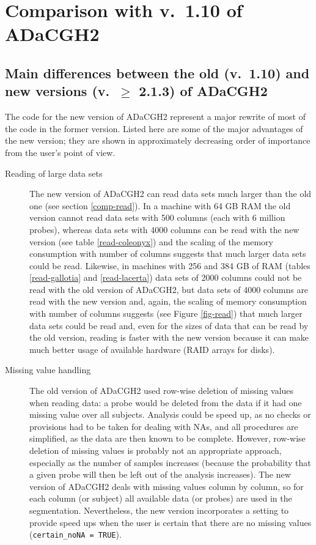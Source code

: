 \documentclass[a4paper,11pt]{article}
\begin{document}
\section{Comparison with v.\ 1.10 of ADaCGH2}

\subsection{Main differences between the old (v.\ 1.10) and new versions
  (v.\ $\ge$ 2.1.3) of ADaCGH2}


The code for the new version of ADaCGH2 represent a major rewrite of most
of the code in the former version. Listed here are some of the major
advantages of the new version; they are shown in approximately decreasing
order of importance from the user's point of view.


\begin{description}

\item[Reading of large data sets] The new version of ADaCGH2 can read data
  sets much larger than the old one (see section \ref{comp-read}). In a
  machine with 64 GB RAM the old version cannot read data sets with 500
  columns (each with 6 million probes), whereas data sets with 4000
  columns can be read with the new version (see table \ref{read-coleonyx})
  and the scaling of the memory consumption with number of columns
  suggests that much larger data sets could be read. Likewise, in machines
  with 256 and 384 GB of RAM (tables \ref{read-gallotia} and
  \ref{read-lacerta}) data sets of 2000 columns could not be read with the
  old version of ADaCGH2, but data sets of 4000 columns are read with the
  new version and, again, the scaling of memory consumption with number of
  columns suggests (see Figure \ref{fig-read}) that much larger data sets could be
  read and, even for the sizes of data that can be read by the old
  version, reading is faster with the new version because it can make much
  better usage of available hardware (RAID arrays for disks).



\item[Missing value handling] The old version of ADaCGH2 used row-wise
  deletion of missing values when reading data: a probe would be deleted
  from the data if it had one missing value over all subjects. Analysis
  could be speed up, as no checks or provisions had to be taken for
  dealing with NAs, and all procedures are simplified, as the data are
  then known to be complete. However, row-wise deletion of missing values
  is probably not an appropriate approach, especially as the number of
  samples increases (because the probability that a given probe will then
  be left out of the analysis increases). The new version of ADaCGH2 deals
  with missing values column by column, so for each column (or subject)
  all available data (or probes) are used in the
  segmentation. Nevertheless, the new version incorporates a setting to
  provide speed ups when the user is certain that there are no missing
  values (\texttt{certain\_noNA = TRUE}).



\end{description}
\end{document}
